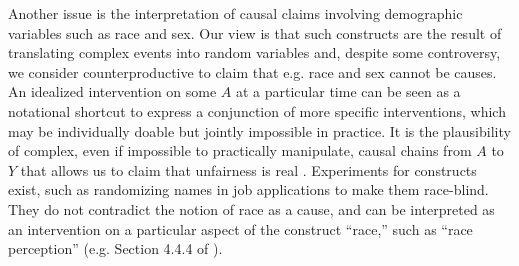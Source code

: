 Another issue is the interpretation of causal claims involving
demographic variables such as race and sex. Our view is that such
constructs are the result of translating complex events into random
variables and, despite some controversy, we consider counterproductive
to claim that e.g. race and sex cannot be causes. An idealized
intervention on some $A$ at a particular time can be seen as a notational
shortcut to express a conjunction of more specific interventions,
which may be individually doable but jointly impossible in practice.
It is the plausibility of complex, even if impossible to practically
manipulate, causal chains from $A$ to $Y$ that allows us to
claim that unfairness is real \cite{glymour:14}. Experiments for
constructs exist, such as randomizing names in job applications to
make them race-blind. They do not contradict the notion of race as a
cause, and can be interpreted as an intervention on a particular
aspect of the construct ``race,'' such as ``race perception'' (e.g. Section 4.4.4 of
\cite{pearl:16}).



